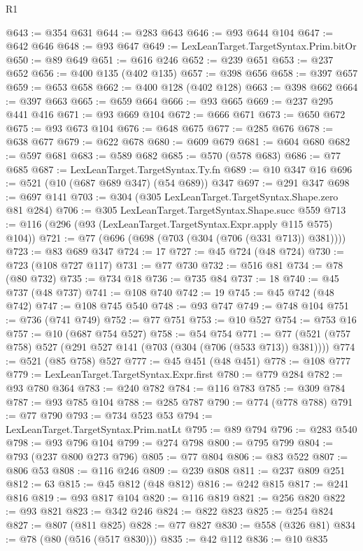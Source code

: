 \begin{lexlean}{R1}
\begin{coremodule}
@643 := @354 @631
@644 := @283 @643
@646 := @93 @644 @104
@647 := @642 @646
@648 := @93 @647
@649 := LexLeanTarget.TargetSyntax.Prim.bitOr
@650 := @89 @649
@651 := @616 @246
@652 := @239 @651
@653 := @237 @652
@656 := @400 @135 (@402 @135)
@657 := @398 @656
@658 := @397 @657
@659 := @653 @658
@662 := @400 @128 (@402 @128)
@663 := @398 @662
@664 := @397 @663
@665 := @659 @664
@666 := @93 @665
@669 := @237 @295 @441 @416
@671 := @93 @669 @104
@672 := @666 @671
@673 := @650 @672
@675 := @93 @673 @104
@676 := @648 @675
@677 := @285 @676
@678 := @638 @677
@679 := @622 @678
@680 := @609 @679
@681 := @604 @680
@682 := @597 @681
@683 := @589 @682
@685 := @570 (@578 @683)
@686 := @77 @685
@687 := LexLeanTarget.TargetSyntax.Ty.fn
@689 := @10 @347 @16
@696 := @521 (@10 (@687 @689 @347) (@54 @689)) @347
@697 := @291 @347
@698 := @697 @141
@703 := @304 (@305 LexLeanTarget.TargetSyntax.Shape.zero @81 @284)
@706 := @305 LexLeanTarget.TargetSyntax.Shape.succ @559
@713 := @116 (@296 (@93 (LexLeanTarget.TargetSyntax.Expr.apply @115 @575) @104))
@721 := @77 (@696 (@698 (@703 (@304 (@706 (@331 @713)) @381))))
@723 := @83 @689 @347
@724 := 17
@727 := @45 @724 (@48 @724)
@730 := @723 (@108 @727 @117)
@731 := @77 @730
@732 := @516 @81
@734 := @78 (@80 @732)
@735 := @734 @18
@736 := @735 @84
@737 := 18
@740 := @45 @737 (@48 @737)
@741 := @108 @740
@742 := 19
@745 := @45 @742 (@48 @742)
@747 := @108 @745 @540
@748 := @93 @747
@749 := @748 @104
@751 := @736 (@741 @749)
@752 := @77 @751
@753 := @10 @527
@754 := @753 @16
@757 := @10 (@687 @754 @527)
@758 := @54 @754
@771 := @77 (@521 (@757 @758) @527 (@291 @527 @141 (@703 (@304 (@706 (@533 @713)) @381))))
@774 := @521 (@85 @758) @527
@777 := @45 @451 (@48 @451)
@778 := @108 @777
@779 := LexLeanTarget.TargetSyntax.Expr.first
@780 := @779 @284
@782 := @93 @780 @364
@783 := @240 @782
@784 := @116 @783
@785 := @309 @784
@787 := @93 @785 @104
@788 := @285 @787
@790 := @774 (@778 @788)
@791 := @77 @790
@793 := @734 @523 @53
@794 := LexLeanTarget.TargetSyntax.Prim.natLt
@795 := @89 @794
@796 := @283 @540
@798 := @93 @796 @104
@799 := @274 @798
@800 := @795 @799
@804 := @793 (@237 @800 @273 @796)
@805 := @77 @804
@806 := @83 @522
@807 := @806 @53
@808 := @116 @246
@809 := @239 @808
@811 := @237 @809 @251
@812 := 63
@815 := @45 @812 (@48 @812)
@816 := @242 @815
@817 := @241 @816
@819 := @93 @817 @104
@820 := @116 @819
@821 := @256 @820
@822 := @93 @821
@823 := @342 @246
@824 := @822 @823
@825 := @254 @824
@827 := @807 (@811 @825)
@828 := @77 @827
@830 := @558 (@326 @81)
@834 := @78 (@80 (@516 (@517 @830)))
@835 := @42 @112
@836 := @10 @835

\end{coremodule}
\end{lexlean}
